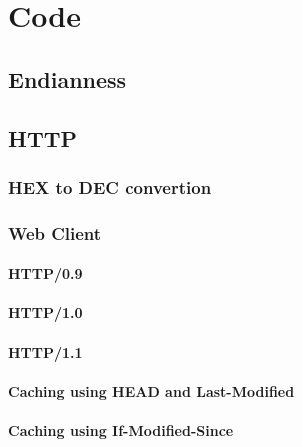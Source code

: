 \chapter{Code}
\section{Endianness}

\clearpage
\section{HTTP}
\subsection{HEX to DEC convertion}

\clearpage
\subsection{Web Client}
\subsubsection{HTTP/0.9}

\clearpage
\subsubsection{HTTP/1.0}

\clearpage
\subsubsection{HTTP/1.1}

\clearpage
\subsubsection{Caching using HEAD and Last-Modified}

\clearpage
\subsubsection{Caching using If-Modified-Since}

\clearpage
